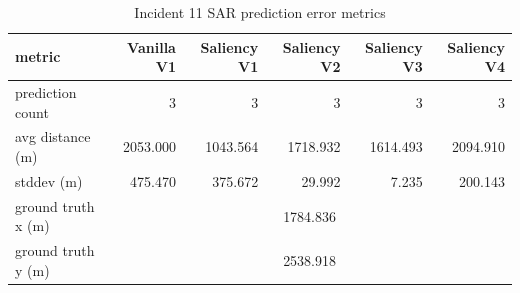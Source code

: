 \begin{table}[ht]
\centering
\caption{Incident 11 SAR prediction error metrics}
\label{tab:sar-incident-11}
\begin{tabular}{lrrrrr}
\hline
metric & Vanilla V1 & Saliency V1 & Saliency V2 & Saliency V3 & Saliency V4 \\
\hline
prediction count & 3 & 3 & 3 & 3 & 3 \\
avg distance (m) & 2053.000 & 1043.564 & 1718.932 & 1614.493 & 2094.910 \\
stddev (m) & 475.470 & 375.672 & 29.992 & 7.235 & 200.143 \\
ground truth x (m) & \multicolumn{5}{c}{1784.836} \\
ground truth y (m) & \multicolumn{5}{c}{2538.918} \\
\hline
\end{tabular}
\end{table}
